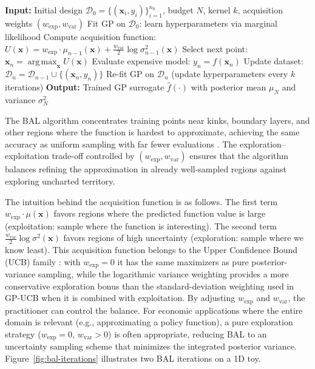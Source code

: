 \documentclass[11pt,a4paper]{report}
\newcommand{\x}{\bm{x}}
\DeclareMathOperator*{\argmax}{arg\,max}
\begin{document}
\begin{definitionbox}
\begin{algorithmic}
\small
\STATE \textbf{Input:} Initial design $\mathcal{D}_0 = \{(\x_i, y_i)\}_{i=1}^{n_0}$, budget $N$, kernel $k$, acquisition weights $(w_{\mathrm{exp}}, w_{\mathrm{var}})$
\STATE Fit GP on $\mathcal{D}_0$: learn hyperparameters via marginal likelihood
    \STATE Compute acquisition function: $U(\x) = w_{\mathrm{exp}} \cdot \mu_{n-1}(\x) + \frac{w_{\mathrm{var}}}{2}\log\sigma_{n-1}^2(\x)$
    \STATE Select next point: $\x_n = \argmax_{\x} U(\x)$
    \STATE Evaluate expensive model: $y_n = f(\x_n)$
    \STATE Update dataset: $\mathcal{D}_n = \mathcal{D}_{n-1} \cup \{(\x_n, y_n)\}$
    \STATE Re-fit GP on $\mathcal{D}_n$ (update hyperparameters every $k$ iterations)
\ENDFOR
\STATE \textbf{Output:} Trained GP surrogate $\hat{f}(\cdot)$ with posterior mean $\mu_N$ and variance $\sigma_N^2$
\end{algorithmic}
\end{definitionbox}

The BAL algorithm concentrates training points near kinks, boundary layers, and other regions where the function is hardest to approximate, achieving the same accuracy as uniform sampling with far fewer evaluations \citep{rennerscheidegger_2018, SCHEIDEGGER201968}.  The exploration--exploitation trade-off controlled by $(w_{\mathrm{exp}}, w_{\mathrm{var}})$ ensures that the algorithm balances refining the approximation in already well-sampled regions against exploring uncharted territory.

The intuition behind the acquisition function is as follows.  The first term $w_{\mathrm{exp}} \cdot \mu(\x)$ favors regions where the predicted function value is large (exploitation: sample where the function is interesting).  The second term $\frac{w_{\mathrm{var}}}{2}\log\sigma^2(\x)$ favors regions of high uncertainty (exploration: sample where we know least).  This acquisition function belongs to the Upper Confidence Bound (UCB) family \citep{srinivas2010gaussian}: with $w_{\mathrm{exp}} = 0$ it has the same maximizers as pure posterior-variance sampling, while the logarithmic variance weighting provides a more conservative exploration bonus than the standard-deviation weighting used in GP-UCB when it is combined with exploitation.  By adjusting $w_{\mathrm{exp}}$ and $w_{\mathrm{var}}$, the practitioner can control the balance.  For economic applications where the entire domain is relevant (e.g., approximating a policy function), a pure exploration strategy ($w_{\mathrm{exp}} = 0$, $w_{\mathrm{var}} > 0$) is often appropriate, reducing BAL to an uncertainty sampling scheme that minimizes the integrated posterior variance.  Figure~\ref{fig:bal-iterations} illustrates two BAL iterations on a 1D toy.
\end{document}
